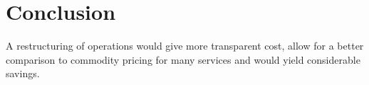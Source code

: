 
\section{Conclusion}\label{sec:conclusion}
 A restructuring of operations would  give more transparent cost, allow for a better comparison to commodity pricing for many services and would
yield considerable savings.
